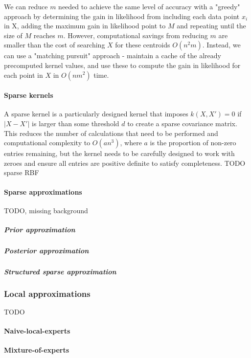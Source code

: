 
We can reduce $m$ needed to achieve the same level of accuracy with a "greedy" approach by determining the gain in likelihood from including each data point $x_i$ in X, adding the maximum gain in likelihood point to $M$ and repeating until the size of $M$ reaches $m$. However, computational savings from reducing $m$ are smaller than the cost of searching $X$ for these centroids $O(n^2m)$. Instead, we can use a "matching pursuit" approach - maintain a cache of the already precomputed kernel values, and use these to compute the gain in likelihood for each point in $X$ in $O(nm^2)$ time. \cite{matching-pursuit}

\paragraph{Sparse kernels}
A sparse kernel is a particularly designed kernel that imposes $k(X,X') = 0$ if $|X - X'|$ is larger than some threshold $d$ to create a sparse covariance matrix. This reduces the number of calculations that need to be performed and computational complexity to $O(an^3)$, where $a$ is the proportion of non-zero entries remaining, but the kernel needs to be carefully designed to work with zeroes and ensure all entries are positive definite to satisfy completeness. TODO sparse RBF

\paragraph{Sparse approximations}
TODO, missing background

\subparagraph{Prior approximation}
\subparagraph{Posterior approximation}
\subparagraph{Structured sparse approximation}


\subsubsection{Local approximations}
TODO

\paragraph{Naive-local-experts}

\paragraph{Mixture-of-experts}

